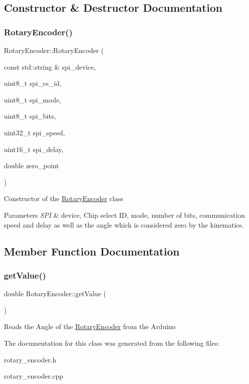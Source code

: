 \subsection{Constructor \& Destructor Documentation}
\mbox{\label{classRotaryEncoder_a4a133815faa29f99d2a2e53b8568a411}} 
\subsubsection{\texorpdfstring{Rotary\+Encoder()}{RotaryEncoder()}}
{\footnotesize\ttfamily Rotary\+Encoder\+::\+Rotary\+Encoder (\begin{DoxyParamCaption}\item[{const std\+::string \&}]{spi\+\_\+device,  }\item[{uint8\+\_\+t}]{spi\+\_\+cs\+\_\+id,  }\item[{uint8\+\_\+t}]{spi\+\_\+mode,  }\item[{uint8\+\_\+t}]{spi\+\_\+bits,  }\item[{uint32\+\_\+t}]{spi\+\_\+speed,  }\item[{uint16\+\_\+t}]{spi\+\_\+delay,  }\item[{double}]{zero\+\_\+point }\end{DoxyParamCaption})}

Constructor of the \hyperlink{classRotaryEncoder}{Rotary\+Encoder} class 
\begin{DoxyParams}{Parameters}
{\em S\+PI} & device, Chip select ID, mode, number of bits, communication speed and delay as well as the angle which is considered zero by the kinematics. \\
\hline
\end{DoxyParams}


\subsection{Member Function Documentation}
\mbox{\label{classRotaryEncoder_adf89df36f38d0ee87b454f22c25a85f0}} 
\subsubsection{\texorpdfstring{get\+Value()}{getValue()}}
{\footnotesize\ttfamily double Rotary\+Encoder\+::get\+Value (\begin{DoxyParamCaption}{ }\end{DoxyParamCaption})}

Reads the Angle of the \hyperlink{classRotaryEncoder}{Rotary\+Encoder} from the Arduino 

The documentation for this class was generated from the following files\+:\begin{DoxyCompactItemize}
\item 
rotary\+\_\+encoder.\+h\item 
rotary\+\_\+encoder.\+cpp\end{DoxyCompactItemize}
